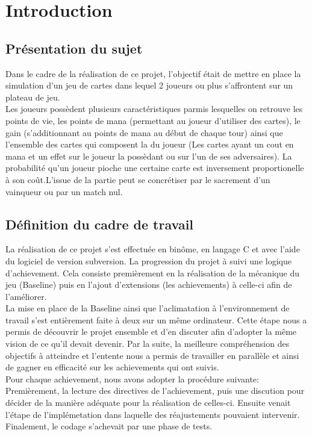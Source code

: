 \documentclass[a4paper]{article}
\begin{document}
\section{Introduction}
\subsection{Présentation du sujet}

Dans le cadre de la réalisation de ce projet, l'objectif était de mettre en place la simulation d'un jeu de cartes dans lequel 2 joueurs ou plus s'affrontent sur un plateau de jeu.\\

Les joueurs possèdent plusieurs caractéristiques parmis lesquelles on retrouve les points de vie, les points de mana (permettant au joueur d'utiliser des cartes), le gain (s'additionnant au points de mana au début de chaque tour) ainsi que l'ensemble des cartes qui composent la du joueur (Les cartes ayant un cout en mana et un effet sur le joueur la possèdant ou sur l'un de ses adversaires). La probabilité qu'un joueur pioche une certaine carte est inversement proportionelle à son coût.L'issue de la partie peut se concrétiser par le sacrement d'un vainqueur ou par un match nul.

\subsection{Définition du cadre de travail}

La réalisation de ce projet s'est effectuée en binôme, en langage C et avec l'aide du logiciel de version subversion. La progression du projet à suivi une logique d'achievement. Cela consiste premièrement en la réalisation de la mécanique du jeu (Baseline) puis en l'ajout d'extensions (les achievements) à celle-ci afin de l'améliorer.\\

La mise en place de la Baseline ainsi que l'aclimatation à l'environnement de travail s'est entièrement faite à deux sur un même ordinateur. Cette étape nous a permis de découvrir le projet ensemble et d'en discuter afin d'adopter la même vision de ce qu'il devait devenir. Par la suite, la meilleure compréhension des objectifs à atteindre et l'entente nous a permis de travailler en parallèle et ainsi de gagner en efficacité sur les achievements qui ont suivis.\\

Pour chaque achievement, nous avons adopter la procédure suivante: Premièrement, la lecture des directives de l'achievement, puis une discution pour décider de la manière adéquate pour la réalisation de celles-ci. Ensuite venait l'étape de l'implémetation dans laquelle des réajustements pouvaient intervenir. Finalement, le codage s'achevait par une phase de tests.
\newpage
\end{document}
